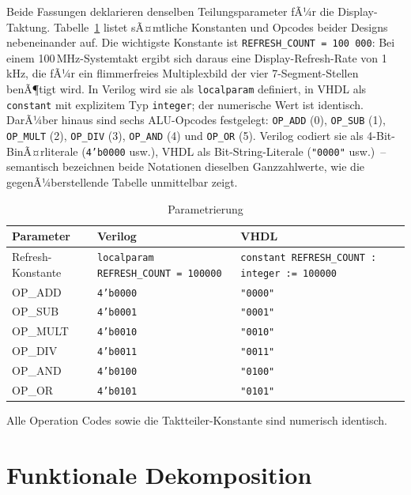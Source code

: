 ﻿\documentclass[12pt,a4paper]{report}
\begin{document}
Beide Fassungen deklarieren denselben Teilungsparameter fÃ¼r die
Display-Taktung.  Tabelle~\ref{tab:paras} listet sÃ¤mtliche Konstanten
und Opcodes beider Designs nebeneinander auf.
Die wichtigste Konstante ist \texttt{REFRESH\_COUNT~=~100\,000}: Bei einem
100\,MHz-Systemtakt ergibt sich daraus eine Display-Refresh-Rate von 1\,kHz,
die fÃ¼r ein flimmerfreies Multiplexbild der vier 7-Segment-Stellen benÃ¶tigt
wird.  In Verilog wird sie als \texttt{localparam} definiert, in VHDL als
\texttt{constant} mit explizitem Typ \texttt{integer}; der numerische Wert
ist identisch.  DarÃ¼ber hinaus sind sechs ALU-Opcodes festgelegt:
\texttt{OP\_ADD} (0), \texttt{OP\_SUB} (1), \texttt{OP\_MULT} (2),
\texttt{OP\_DIV} (3), \texttt{OP\_AND} (4) und \texttt{OP\_OR} (5).
Verilog codiert sie als 4-Bit-BinÃ¤rliterale (\texttt{4'b0000} usw.),
VHDL als Bit-String-Literale (\texttt{"0000"} usw.)~-- semantisch
bezeichnen beide Notationen dieselben Ganzzahlwerte, wie die
gegenÃ¼berstellende Tabelle unmittelbar zeigt.

\begin{table}
	\centering
	\begin{tabular}{|l|l|l|}
		\hline
		\textbf{Parameter} & \textbf{Verilog} & \textbf{VHDL} \\
		\hline
		Refresh-Konstante & \texttt{localparam REFRESH\_COUNT = 100000} & \texttt{constant REFRESH\_COUNT : integer := 100000} \\
		OP\_ADD  & \texttt{4'b0000} & \texttt{"0000"} \\
		OP\_SUB  & \texttt{4'b0001} & \texttt{"0001"} \\
		OP\_MULT & \texttt{4'b0010} & \texttt{"0010"} \\
		OP\_DIV  & \texttt{4'b0011} & \texttt{"0011"} \\
		OP\_AND  & \texttt{4'b0100} & \texttt{"0100"} \\
		OP\_OR   & \texttt{4'b0101} & \texttt{"0101"} \\
		\hline
	\end{tabular}
	\caption{Parametrierung}
	\label{tab:paras}
\end{table}

Alle Operation Codes sowie die Taktteiler-Konstante sind numerisch identisch.

\section{Funktionale Dekomposition}
\label{subsec:dekomposition}
\end{document}
